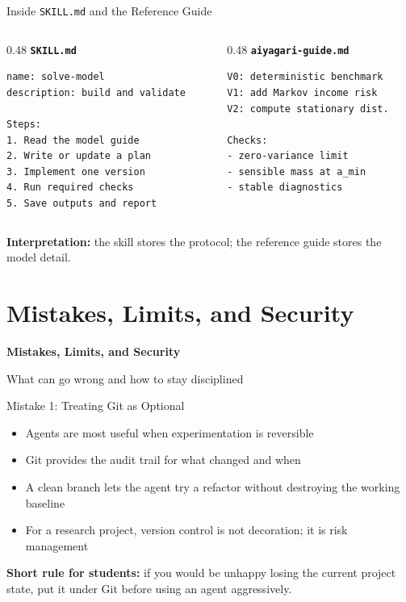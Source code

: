 \documentclass[10pt,english,aspectratio=169]{beamer}
\newcommand{\sectiondivider}[2]{%
\begin{frame}[plain,noframenumbering]
\begin{center}
\vfill
{\Large\textbf{#1}\par}
\vspace{0.35cm}
{\normalsize #2\par}
\vfill
\end{center}
\end{frame}
}
\begin{document}
\begin{frame}[fragile]{Inside \texttt{SKILL.md} and the Reference Guide}
\begin{columns}[T]
\begin{column}{0.48\textwidth}
\textbf{\texttt{SKILL.md}}
\begin{lstlisting}[style=pythonstyle,language={},basicstyle=\ttfamily\tiny,numbers=none]
name: solve-model
description: build and validate

Steps:
1. Read the model guide
2. Write or update a plan
3. Implement one version
4. Run required checks
5. Save outputs and report
\end{lstlisting}
\end{column}
\begin{column}{0.48\textwidth}
\textbf{\texttt{aiyagari-guide.md}}
\begin{lstlisting}[style=pythonstyle,language={},basicstyle=\ttfamily\tiny,numbers=none]
V0: deterministic benchmark
V1: add Markov income risk
V2: compute stationary dist.

Checks:
- zero-variance limit
- sensible mass at a_min
- stable diagnostics
\end{lstlisting}
\end{column}
\end{columns}

\vspace{0.2cm}

\textbf{Interpretation:} the skill stores the protocol; the reference guide stores the model detail.
\end{frame}

\section{Mistakes, Limits, and Security}

\sectiondivider{Mistakes, Limits, and Security}{What can go wrong and how to stay disciplined}

\begin{frame}{Mistake 1: Treating Git as Optional}
\begin{itemize}
    \item Agents are most useful when experimentation is reversible
    \item Git provides the audit trail for what changed and when
    \item A clean branch lets the agent try a refactor without destroying the working baseline
    \item For a research project, version control is not decoration; it is risk management
\end{itemize}

\vspace{0.3cm}

\textbf{Short rule for students:} if you would be unhappy losing the current project state, put it under Git before using an agent aggressively.
\end{frame}
\end{document}
